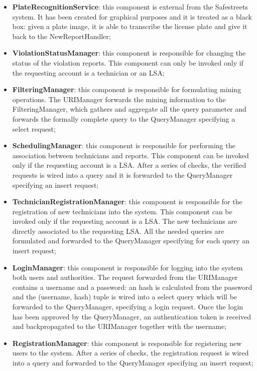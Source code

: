 \begin{itemize}
    \item \textbf{PlateRecognitionService}: this component is external from the Safestreets system. It has been created for graphical purposes and it is treated as a black box: given a plate image, it is able to transcribe the license plate and give it back to the NewReportHandler;
    \item \textbf{ViolationStatusManager}: this component is responsible for changing the status of the violation reports. This component can only be invoked only if the requesting account is a technician or an LSA;
    \item \textbf{FilteringManager}: this component is responsible for formulating mining operations. The URIManager forwards the mining information to the FilteringManager, which gathers and aggregate all the query parameter and forwards the formally complete query to the QueryManager specifying a select request;
    \item \textbf{SchedulingManager}: this component is responsible for performing the association between technicians and reports. This component can be invoked only if the requesting account is a LSA. After a series of checks, the verified requests is wired into a query and it is forwarded to the QueryManager specifying an insert request;
    \item \textbf{TechnicianRegistrationManager}: this component is responsible for the registration of new technicians into the system. This component can be invoked only if the requesting account is a LSA. The new technicians are directly associated to the requesting LSA. All the needed queries are formulated and forwarded to the QueryManager specifying for each query an insert request;
    \item \textbf{LoginManager}: this component is responsible for logging into the system both users and authorities. The request forwarded from the URIManager contains a username and a password: an hash is calculated from the password and the (username, hash) tuple is wired into a select query which will be forwarded to the QueryManager, specifying a login request. Once the login has been approved by the QueryManager, an authentication token is received and backpropagated to the URIManager together with the username;
    \item \textbf{RegistrationManager}: this component is responsible for registering new users to the system. After a series of checks, the registration request is wired into a query and forwarded to the QueryManager specifying an insert request;

\end{itemize}

